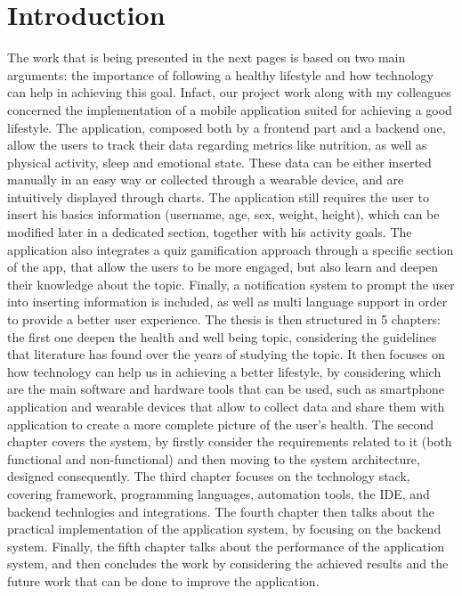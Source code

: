\section*{Introduction}
The work that is being presented in the next pages is based on two main arguments: the importance of following a healthy lifestyle and how technology can help in achieving this goal. Infact, our project work along with my colleagues concerned the implementation of a mobile application suited for achieving a good lifestyle. The application, composed both by a frontend part and a backend one, allow the users to track their data regarding metrics like nutrition, as well as physical activity, sleep and emotional state. These data can be either inserted manually in an easy way or collected through a wearable device, and are intuitively displayed through charts. The application still requires the user to insert his basics information (username, age, sex, weight, height), which can be modified later in a dedicated section, together with his activity goals. The application also integrates a quiz gamification approach through a specific section of the app, that allow the users to be more engaged, but also learn and deepen their knowledge about the topic. Finally, a notification system to prompt the user into inserting information is included, as well as multi language support in order to provide a better user experience. The thesis is then structured in 5 chapters: the first one deepen the health and well being topic, considering the guidelines that literature has found over the years of studying the topic. It then focuses on how technology can help us in achieving a better lifestyle, by considering which are the main software and hardware tools that can be used, such as smartphone application and wearable devices that allow to collect data and share them with application to create a more complete picture of the user's health. The second chapter covers the system, by firstly consider the requirements related to it (both functional and non-functional) and then moving to the system architecture, designed consequently. The third chapter focuses on the technology stack, covering framework, programming languages, automation tools, the IDE, and backend technlogies and integrations. The fourth chapter then talks about the practical implementation of the application system, by focusing on the backend system. Finally, the fifth chapter talks about the performance of the application system, and then concludes the work by considering the achieved results and the future work that can be done to improve the application.